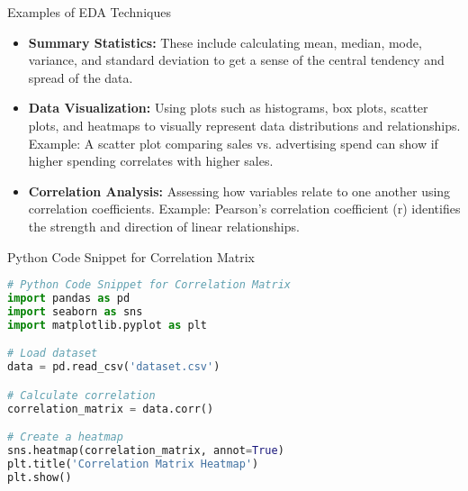 \documentclass[aspectratio=169]{beamer}
\begin{document}
\begin{frame}[fragile]{Examples of EDA Techniques}
    \begin{itemize}
        \item \textbf{Summary Statistics:} 
        These include calculating mean, median, mode, variance, and standard deviation to get a sense of the central tendency and spread of the data.
        
        \item \textbf{Data Visualization:} 
        Using plots such as histograms, box plots, scatter plots, and heatmaps to visually represent data distributions and relationships. 
        \newline Example: A scatter plot comparing sales vs. advertising spend can show if higher spending correlates with higher sales.
        
        \item \textbf{Correlation Analysis:} 
        Assessing how variables relate to one another using correlation coefficients. 
        \newline Example: Pearson’s correlation coefficient (r) identifies the strength and direction of linear relationships.
    \end{itemize}
\end{frame}

\begin{frame}[fragile]{Python Code Snippet for Correlation Matrix}
    \begin{lstlisting}[language=Python]
# Python Code Snippet for Correlation Matrix
import pandas as pd
import seaborn as sns
import matplotlib.pyplot as plt

# Load dataset
data = pd.read_csv('dataset.csv')

# Calculate correlation
correlation_matrix = data.corr()

# Create a heatmap
sns.heatmap(correlation_matrix, annot=True)
plt.title('Correlation Matrix Heatmap')
plt.show()
    \end{lstlisting}
\end{frame}
\end{document}
